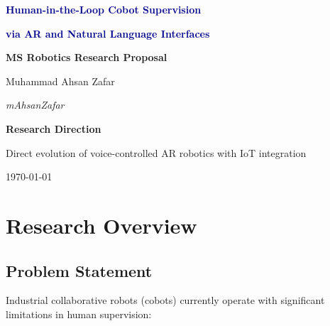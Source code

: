 \documentclass[12pt,a4paper,oneside]{book}
\begin{document}
\begin{titlepage}
    \centering
    \vspace*{2cm}
    
    {\Huge \textbf{\textcolor{darkblue}{Human-in-the-Loop Cobot Supervision}}}
    
    \vspace{0.5cm}
    {\Huge \textbf{\textcolor{darkblue}{via AR and Natural Language Interfaces}}}
    
    \vspace{2cm}
    {\Large \textbf{MS Robotics Research Proposal}}
    
    \vspace{1.5cm}
    {\Large Muhammad Ahsan Zafar}
    
    \vspace{0.5cm}
    {\normalsize \textit{mAhsanZafar}}
    
    \vspace{2cm}
    
    \vspace{2cm}
    {\large \textbf{Research Direction}}
    
    {\normalsize Direct evolution of voice-controlled AR robotics with IoT integration}
    
    \vspace{1.5cm}
    {\normalsize \today}
    
    \vfill
\end{titlepage}

\tableofcontents
\newpage

\chapter{Research Overview}

\section{Problem Statement}

Industrial collaborative robots (cobots) currently operate with significant limitations in human supervision:
\end{document}
